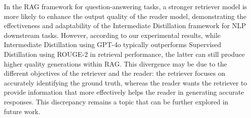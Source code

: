 In the RAG framework for question-answering tasks, a stronger retriever model is more likely to enhance the output quality of the reader model, demonstrating the effectiveness and adaptability of the Intermediate Distillation framework for NLP downstream tasks.
However, according to our experimental results, while Intermediate Distillation using GPT-4o typically outperforms Supervised Distillation using ROUGE-2 in retrieval performance, the latter can still produce higher quality generations within RAG. 
This divergence may be due to the different objectives of the retriever and the reader: the retriever focuses on accurately identifying the ground truth, whereas the reader wants the retriever to provide information that more effectively helps the reader in generating accurate responses.
This discrepancy remains a topic that can be further explored in future work.
